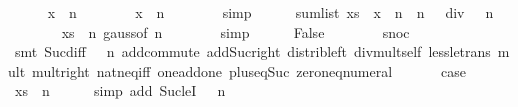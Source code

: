 \begin{isabellebody}
\ \ \ \ \isamarkupfalse%
\ {\isachardoublequoteopen}x\ {\isachargreater}\ n{\isachardoublequoteclose}\isanewline
\ \ \ \ \ \ \isamarkupfalse%
\ {\isacharbackquoteopen}x\ {\isasymge}\ n{\isacharbackquoteclose}\isanewline
\ \ \ \ \ \ \isamarkupfalse%
\ simp\isanewline
\ \ \ \ \isamarkupfalse%
\ {\isachardoublequoteopen}sum{\isacharunderscore}list\ {\isacharparenleft}xs\ {\isacharat}\ {\isacharbrackleft}x{\isacharbrackright}{\isacharparenright}\ {\isachargreater}\ n\ {\isacharasterisk}\ {\isacharparenleft}n\ {\isacharminus}\ {}{\isacharparenright}\ div\ {}\ {\isacharplus}\ n{\isachardoublequoteclose}\isanewline
\ \ \ \ \ \ \isamarkupfalse%
\ {\isacharbackquoteopen}xs\ {\isacharequal}\ {\isacharbrackleft}{}{\isachardot}{\isachardot}{\isacharless}n{\isacharbrackright}{\isacharbackquoteclose}\ gauss{\isacharbrackleft}of\ n{\isacharbrackright}\isanewline
\ \ \ \ \ \ \isamarkupfalse%
\ simp\isanewline
\ \ \ \ \isamarkupfalse%
\ False\isanewline
\ \ \ \ \ \ \isamarkupfalse%
\ snoc{\isacharparenleft}{}{\isacharparenright}\isanewline
\ \ \ \ \ \ \isamarkupfalse%
\ {\isacharparenleft}smt\ Suc{\isacharunderscore}diff{\isacharunderscore}{}\ {\isacartoucheopen}{}\ {\isacharless}\ n{\isacartoucheclose}\ add{\isachardot}commute\ add{\isacharunderscore}Suc{\isacharunderscore}right\ distrib{\isacharunderscore}left\ div{\isacharunderscore}mult{\isacharunderscore}self{}\ less{\isacharunderscore}le{\isacharunderscore}trans\ mult{\isacharunderscore}{}\ mult{\isacharunderscore}{}{\isacharunderscore}right\ nat{\isacharunderscore}neq{\isacharunderscore}iff\ one{\isacharunderscore}add{\isacharunderscore}one\ plus{\isacharunderscore}{}{\isacharunderscore}eq{\isacharunderscore}Suc\ zero{\isacharunderscore}neq{\isacharunderscore}numeral{\isacharparenright}\isanewline
\ \ \isamarkupfalse%
\isanewline
\ \ \isamarkupfalse%
\ {\isacharquery}case\isanewline
\ \ \ \ \isamarkupfalse%
\ {\isacharbackquoteopen}xs\ {\isacharequal}\ {\isacharbrackleft}{}{\isachardot}{\isachardot}{\isacharless}n{\isacharbrackright}{\isacharbackquoteclose}\isanewline
\ \ \ \ \isamarkupfalse%
\ {\isacharparenleft}simp\ add{\isacharcolon}\ Suc{\isacharunderscore}leI\ {\isacartoucheopen}{}\ {\isacharless}\ n{\isacartoucheclose}{\isacharparenright}\isanewline
{}\isamarkupfalse%

\end{isabellebody}
